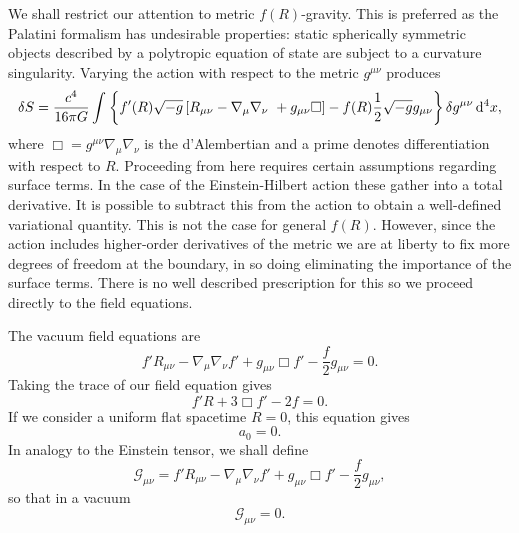 We shall restrict our attention to metric $f(R)$-gravity. This is preferred as the Palatini formalism has undesirable properties: static spherically symmetric objects described by a polytropic equation of state are subject to a curvature singularity\cite{Barausse2008b, Barausse2008a}. Varying the action with respect to the metric $g^{\mu\nu}$ produces
\begin{equation}
\delta S = \frac{c^4}{16\pi G}\int_{}^{}{\left\{f'(R)\sqrt{-g}\left[R_{\mu\nu} - \nabla_\mu\nabla_\nu\ + g_{\mu\nu}\Box\right] - f(R)\frac{1}{2}\sqrt{-g}g_{\mu\nu}\right\}\delta g^{\mu\nu}}\,\mathrm{d}{^4x},
\end{equation}
where $\Box = g^{\mu\nu}\nabla_\mu\nabla_\nu$ is the d'Alembertian and a prime denotes differentiation with respect to $R$. Proceeding from here requires certain assumptions regarding surface terms. In the case of the Einstein-Hilbert action these gather into a total derivative. It is possible to subtract this from the action to obtain a well-defined variational quantity\cite{York1972, Gibbons1977}. This is not the case for general $f(R)$\cite{Madsen1989}. However, since the action includes higher-order derivatives of the metric we are at liberty to fix more degrees of freedom at the boundary, in so doing eliminating the importance of the surface terms\cite{Dyer2009a, Sotiriou2010}. There is no well described prescription for this so we proceed directly to the field equations.

The vacuum field equations are
\begin{equation}
f'R_{\mu\nu} - \nabla_\mu\nabla_\nu f' + g_{\mu\nu}\Box f' - \frac{f}{2}g_{\mu\nu} = 0.
\label{eq:Field_eq}
\end{equation}
Taking the trace of our field equation gives
\begin{equation}
f'R + 3\Box f' - 2f = 0.
\label{eq:Trace_eq}
\end{equation}
If we consider a uniform flat spacetime $R = 0$, this equation gives
\begin{equation}
a_0 = 0.
\label{eq:a_0}
\end{equation}
In analogy to the Einstein tensor, we shall define
\begin{equation}
\mathcal{G}_{\mu\nu} = f'R_{\mu\nu} - \nabla_\mu\nabla_\nu f' + g_{\mu\nu}\Box f' - \frac{f}{2}g_{\mu\nu},
\label{eq:G_tensor}
\end{equation}
so that in a vacuum
\begin{equation}
\mathcal{G}_{\mu\nu} = 0.
\end{equation}


